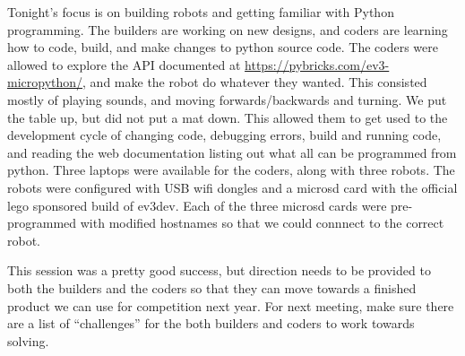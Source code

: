 
Tonight's focus is on building robots and getting familiar with Python programming.  The builders are working on new designs, and coders are learning how to code, build, and make changes to python source code.  The coders were allowed to explore the API documented at \url{https://pybricks.com/ev3-micropython/}, and make the robot do whatever they wanted.  This consisted mostly of playing sounds, and moving forwards/backwards and turning.  We put the table up, but did not put a mat down.  This allowed them to get used to the development cycle of changing code, debugging errors, build and running code, and reading the web documentation listing out what all can be programmed from python.  Three laptops were available for the coders, along with three robots.  The robots were configured with USB wifi dongles and a microsd card with the official lego sponsored build of ev3dev.  Each of the three microsd cards were pre-programmed with modified hostnames so that we could connnect to the correct robot.

This session was a pretty good success, but direction needs to be provided to both the builders and the coders so that they can move towards a finished product we can use for competition next year.  For next meeting, make sure there are a list of ``challenges'' for the both builders and coders to work towards solving.
